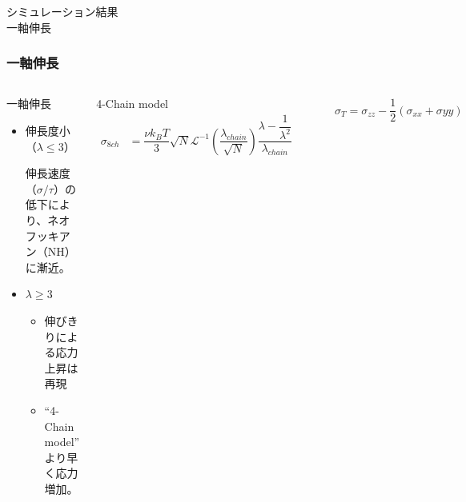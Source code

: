 \documentclass[11pt, dvipdfmx]{beamer}
\begin{document}
\begin{frame}
\Large{シミュレーション結果\\一軸伸長}
\end{frame}

\begin{frame}
\frametitle{一軸伸長}

\begin{columns}[totalwidth=1\textwidth]

\begin{block}{一軸伸長}
\begin{itemize}
\footnotesize
\item
伸長度小（$\lambda \leq 3$）

伸長速度（$\sigma/\tau$）の低下により、ネオフッキアン（NH）に漸近。

\item
$\lambda \geq 3$
	\begin{itemize}
	\footnotesize
	\item
	伸びきりによる応力上昇は再現
	\item
	``4-Chain model'' より早く応力増加。
	\end{itemize}
\end{itemize}
\end{block}

\footnotesize
4-Chain model
\tiny
\begin{align*}
\sigma_{8ch}
	&= \dfrac{\nu k_B T }{3}\sqrt{N}
			\mathcal{L}^{-1} \left(\dfrac{\lambda_{chain}}{ \sqrt{N} } \right)
			\dfrac{\lambda-\dfrac{1}{\lambda^2}}{\lambda_{chain}} 
\end{align*}

\includegraphics[width=60mm]{./fig/SS.pdf}


\tiny
\begin{align*}
\sigma_{T} = \sigma_{zz} -\dfrac{1}{2}(\sigma_{xx}+\sigma{yy})
\end{align*}

\end{columns}

\end{frame}
\end{document}
